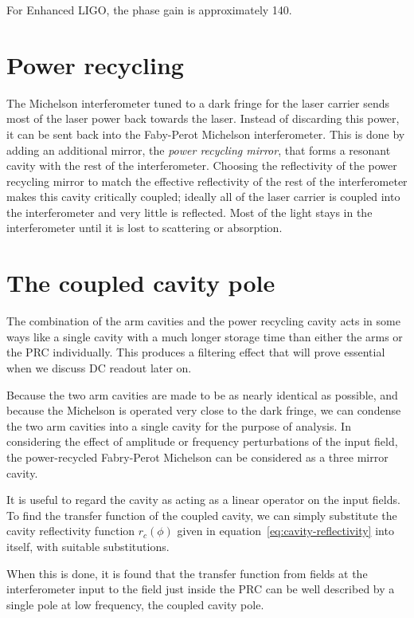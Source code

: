 For Enhanced LIGO, the phase gain is approximately 140.

\section{Power recycling}

The Michelson interferometer tuned to a dark fringe for the laser
carrier sends most of the laser power back towards the laser.  Instead
of discarding this power, it can be sent back into the Faby-Perot
Michelson interferometer.  This is done by adding an additional
mirror, the \emph{power recycling mirror}, that forms a resonant
cavity with the rest of the interferometer.  Choosing the reflectivity
of the power recycling mirror to match the effective reflectivity of
the rest of the interferometer makes this cavity critically coupled;
ideally all of the laser carrier is coupled into the interferometer
and very little is reflected.  Most of the light stays in the
interferometer until it is lost to scattering or absorption.

\section{The coupled cavity pole}

The combination of the arm cavities and the power recycling cavity acts
in some ways like a single cavity with a much longer storage time than
either the arms or the PRC individually.  This produces a filtering 
effect that will prove essential when we discuss DC readout later on.

Because the two arm cavities are made to be as nearly identical as
possible, and because the Michelson is operated very close to the dark
fringe, we can condense the two arm cavities into a single cavity for
the purpose of analysis.  In considering the effect of amplitude or
frequency perturbations of the input field, the power-recycled
Fabry-Perot Michelson can be considered as a three mirror cavity.

It is useful to regard the cavity as acting as a linear operator on
the input fields.  To find the transfer function of the coupled
cavity, we can simply substitute the cavity reflectivity function
$r_c(\phi)$ given in equation~\ref{eq:cavity-reflectivity} into
itself, with suitable substitutions.

When this is done, it is found that the transfer function from fields at
the interferometer input to the field just inside the PRC can be well
described by a single pole at low frequency, the coupled cavity pole.

